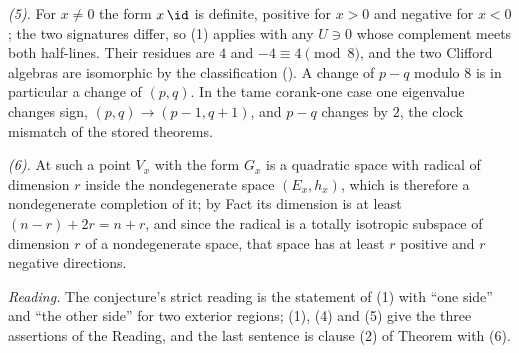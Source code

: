 \emph{(5).} For $x \neq 0$ the form $x\,\id$ is definite, positive for $x > 0$ and negative for $x < 0$; the two signatures differ, so (1) applies with any $U \ni 0$ whose complement meets both half-lines. Their residues are $4$ and $-4 \equiv 4 \pmod 8$, and the two Clifford algebras are isomorphic by the classification (). A change of $p - q$ modulo $8$ is in particular a change of $(p,q)$. In the tame corank-one case one eigenvalue changes sign, $(p,q) \to (p-1,q+1)$, and $p - q$ changes by $2$, the clock mismatch of the stored theorems.

\emph{(6).} At such a point $V_{x}$ with the form $G_{x}$ is a quadratic space with radical of dimension $r$ inside the nondegenerate space $(E_{x}, h_{x})$, which is therefore a nondegenerate completion of it; by Fact  its dimension is at least $(n - r) + 2r = n + r$, and since the radical is a totally isotropic subspace of dimension $r$ of a nondegenerate space, that space has at least $r$ positive and $r$ negative directions.

\emph{Reading.} The conjecture's strict reading is the statement of (1) with ``one side'' and ``the other side'' for two exterior regions; (1), (4) and (5) give the three assertions of the Reading, and the last sentence is clause (2) of Theorem  with (6).
